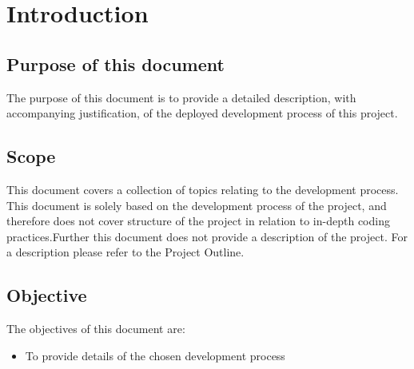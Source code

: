 \chapter{Introduction}



\section{Purpose of this document}
The purpose of this document is to provide a detailed description, with accompanying justification, of the deployed 
development process of this project.

\section{Scope}
This document covers a collection of topics relating to the development process. This document is solely based on 
the development process of the project, and therefore does not cover structure of the project in relation to 
in-depth coding practices.\newline Further this document does not provide a description of the project. For a 
description please refer to the Project Outline\cite{project_outline}.

\section{Objective}
The objectives of this document are:

\begin{itemize}
   \item To provide details of the chosen development process
\end{itemize}

